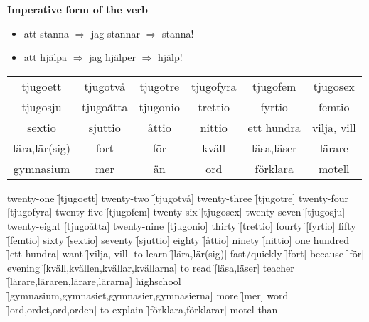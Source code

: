 
\begin{flushleft}
    \textbf{Imperative form of the verb}
    \begin{itemize}
        \item att stanna $\Rightarrow$ jag stannar $\Rightarrow$ stanna!
        \item att hjälpa $\Rightarrow$ jag hjälper $\Rightarrow$ hjälp!
    \end{itemize}
\end{flushleft}

\begin{center}
    \begin{tabular}{|c c c c c c|}
        \hline
        tjugoett & tjugotvå & tjugotre & tjugofyra & tjugofem & tjugosex \\
        tjugosju & tjugoåtta & tjugonio & trettio & fyrtio & femtio \\
        sextio & sjuttio & åttio & nittio & ett hundra & vilja, vill \\
        lära,lär(sig) & fort & för & kväll & läsa,läser & lärare \\
        gymnasium & mer & än & ord & förklara & motell \\
        \hline
    \end{tabular}
\end{center}

\begin{questions}
    \begin{multicols}{2}
        \raggedcolumns
        \question twenty-one \f[tjugoett]
        \question twenty-two \f[tjugotvå]
        \question twenty-three \f[tjugotre]
        \question twenty-four \f[tjugofyra]
        \question twenty-five \f[tjugofem]
        \question twenty-six \f[tjugosex]
        \question twenty-seven \f[tjugosju]
        \question twenty-eight \f[tjugoåtta]
        \question twenty-nine \f[tjugonio]
        \question thirty \f[trettio]
        \question fourty \f[fyrtio]
        \question fifty \f[femtio]
        \question sixty \f[sextio]
        \question seventy \f[sjuttio]
        \question eighty \f[åttio]
        \question ninety \f[nittio]
        \question one hundred \f[ett hundra]
        \question want \f[vilja, vill]
        \question to learn \f[lära,lär(sig)]
        \question fast/quickly \f[fort]
        \question because \f[för]
        \question evening \f[kväll,kvällen,kvällar,kvällarna]
        \question to read \f[läsa,läser]
        \question teacher \f[lärare,läraren,lärare,lärarna]
        \question highschool \f[gymnasium,gymnasiet,gymnasier,gymnasierna]
        \question more \f[mer]
        \question word \f[ord,ordet,ord,orden]
        \question to explain \f[förklara,förklarar]
        \question motel 
        \question than 
    \end{multicols}
\end{questions}